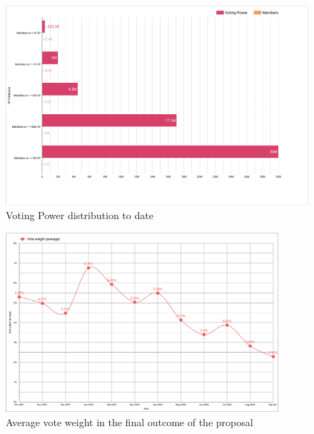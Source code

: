\documentclass[MSE,Master,english]{twbook}%
\begin{document}
\begin{figure}[H]
  \centering
  \includegraphics[width=\textwidth]{metrics/vp_distribution_members.png}
  \caption{Voting Power distribution to date}
  \label{fig:vp_distribution_members}
\end{figure}
\begin{figure}[H]
  \centering
  \includegraphics[width=0.9\textwidth]{metrics/vote_weight.png}
  \caption{Average vote weight in the final outcome of the proposal}
  \label{fig:vote_weight}
\end{figure}
\end{document}
